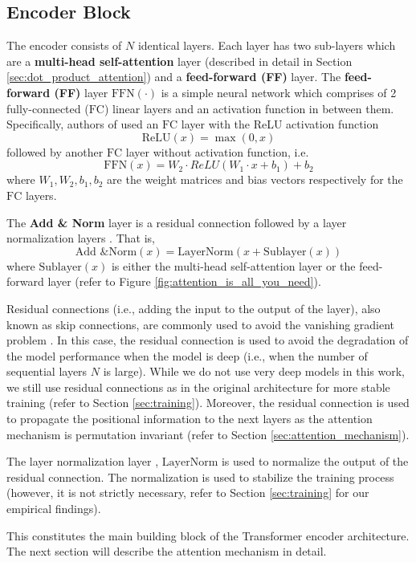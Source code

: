 \documentclass[a4paper, twoside]{report}
\theoremstyle{definition}
\numberwithin{equation}{section}
\begin{document}
\subsection{Encoder Block}

The encoder consists of $N$ identical layers. Each layer has two sub-layers which are a
\textbf{multi-head self-attention} layer (described in detail in Section \ref{sec:dot_product_attention})
and a \textbf{feed-forward (FF)} layer.
The \textbf{feed-forward (FF)} layer $\text{FFN}(\cdot)$ is a simple neural network
which comprises of 2 fully-connected ($\text{FC}$) linear layers and an activation function in between them.
Specifically, authors of \cite{1706.03762} used an $\text{FC}$ layer with
the ReLU activation function $$\text{ReLU}(x)=\max(0, x)$$
followed by another $\text{FC}$ layer without activation function, i.e.
$$\text{FFN}(x)=W_2 \cdot ReLU(W_1\cdot x+b_1)+b_2$$
where $W_1, W_2, b_1, b_2$ are the weight matrices and bias vectors respectively for the $\text{FC}$ layers.

The \textbf{Add \& Norm} layer is a residual connection \cite{1512.03385} followed by a layer normalization layers \cite{1607.06450}.
That is,
$$\text{Add \& Norm}(x)=\text{LayerNorm}(x+\text{Sublayer}(x))$$
where $\text{Sublayer}(x)$ is either the multi-head self-attention layer or the feed-forward layer (refer to Figure \ref{fig:attention_is_all_you_need}).

Residual connections (i.e., adding the input to the output of the layer),
also known as skip connections, are commonly used to avoid the vanishing gradient problem \cite{1512.03385}.
In this case, the residual connection is used to avoid the degradation of the model performance
when the model is deep (i.e., when the number of sequential layers $N$ is large).
While we do not use very deep models in this work, we still use residual connections
as in the original architecture for more stable training (refer to Section \ref{sec:training}).
Moreover, the residual connection is used to propagate the positional information to the next layers
as the attention mechanism is permutation invariant (refer to Section \ref{sec:attention_mechanism}).

The layer normalization layer \cite{1607.06450}, $\text{LayerNorm}$ is used to normalize the output of the residual connection.
The normalization is used to stabilize the training process (however, it is not strictly necessary, refer to Section \ref{sec:training}
for our empirical findings).

This constitutes the main building block of the Transformer encoder architecture.
The next section will describe the attention mechanism in detail.
\end{document}
